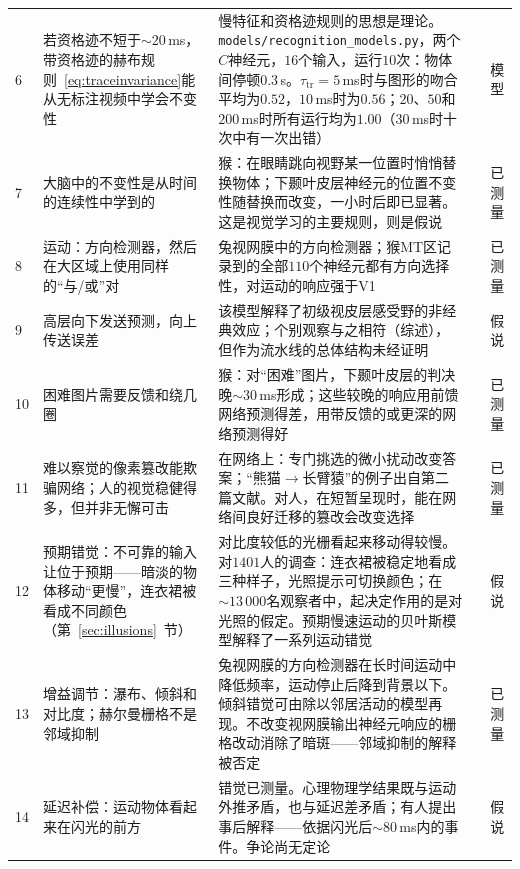 {\begin{longtable}{>{\raggedright}p{0.5cm}>{\raggedright}p{4.0cm}>{\raggedright}p{5.6cm}>{\raggedright}p{2.3cm}>{\raggedright\arraybackslash}p{1.7cm}}
6 & 若资格迹不短于$\sim20$\,ms，带资格迹的赫布规则~\eqref{eq:traceinvariance}能从无标注视频中学会不变性 & 慢特征和资格迹规则的思想是理论。\texttt{models/\allowbreak recognition\_models.py}，两个$C$神经元，$16$个输入，运行$10$次：物体间停顿$0.3$\,s。$\tau_{\text{tr}}=5$\,ms时与图形的吻合平均为$0.52$，$10$\,ms时为$0.56$；$20$、$50$和$200$\,ms时所有运行均为$1.00$（$30$\,ms时十次中有一次出错） & \cite{Foldiak1991,WiskottSejnowski2002} & 模型 \\
7 & 大脑中的不变性是从时间的连续性中学到的 & 猴：在眼睛跳向视野某一位置时悄悄替换物体；下颞叶皮层神经元的位置不变性随替换而改变，一小时后即已显著。这是视觉学习的主要规则，则是假说 & \cite{LiDiCarlo2008} & 已测量 \\
8 & 运动：方向检测器，然后在大区域上使用同样的“与/或”对 & 兔视网膜中的方向检测器；猴MT区记录到的全部$110$个神经元都有方向选择性，对运动的响应强于V1 & \cite{Barlow1965,Albright1984} & 已测量 \\
9 & 高层向下发送预测，向上传送误差 & 该模型解释了初级视皮层感受野的非经典效应；个别观察与之相符（综述），但作为流水线的总体结构未经证明 & \cite{RaoBallard1999,Keller2018} & 假说 \\
10 & 困难图片需要反馈和绕几圈 & 猴：对“困难”图片，下颞叶皮层的判决晚$\sim30$\,ms形成；这些较晚的响应用前馈网络预测得差，用带反馈的或更深的网络预测得好 & \cite{Kar2019} & 已测量 \\
11 & 难以察觉的像素篡改能欺骗网络；人的视觉稳健得多，但并非无懈可击 & 在网络上：专门挑选的微小扰动改变答案；“熊猫$\to$长臂猿”的例子出自第二篇文献。对人，在短暂呈现时，能在网络间良好迁移的篡改会改变选择 & \cite{Szegedy2014,Goodfellow2015,Elsayed2018} & 已测量 \\
12 & 预期错觉：不可靠的输入让位于预期——暗淡的物体移动“更慢”，连衣裙被看成不同颜色（第~\ref{sec:illusions}~节） & 对比度较低的光栅看起来移动得较慢。对$1401$人的调查：连衣裙被稳定地看成三种样子，光照提示可切换颜色；在$\sim13\,000$名观察者中，起决定作用的是对光照的假定。预期慢速运动的贝叶斯模型解释了一系列运动错觉 & \cite{Thompson1982,LaferSousa2015,Wallisch2017,Weiss2002,Purves2011} & 假说 \\
13 & 增益调节：瀑布、倾斜和对比度；赫尔曼栅格不是邻域抑制 & 兔视网膜的方向检测器在长时间运动中降低频率，运动停止后降到背景以下。倾斜错觉可由除以邻居活动的模型再现。不改变视网膜输出神经元响应的栅格改动消除了暗斑——邻域抑制的解释被否定 & \cite{BarlowHill1963,Schwartz2009,SchillerCarvey2005} & 已测量 \\
14 & 延迟补偿：运动物体看起来在闪光的前方 & 错觉已测量。心理物理学结果既与运动外推矛盾，也与延迟差矛盾；有人提出事后解释——依据闪光后$\sim80$\,ms内的事件。争论尚无定论 & \cite{Nijhawan1994,EaglemanSejnowski2000} & 假说 \\

\end{longtable}}
